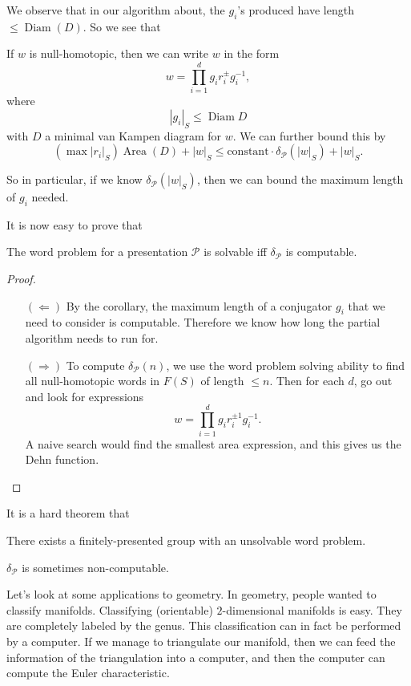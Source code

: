\documentclass[a4paper]{article}
\DeclareMathOperator\Area{Area}
\DeclareMathOperator\Diam{Diam}
\begin{document}
We observe that in our algorithm about, the $g_i$'s produced have length $\leq \Diam(D)$. So we see that
\begin{cor}
  If $w$ is null-homotopic, then we can write $w$ in the form
  \[
    w = \prod_{i = 1}^d g_i r_i^{\pm} g_i^{-1},
  \]
  where
  \[
    |g_i|_S \leq \Diam D
  \]
  with $D$ a minimal van Kampen diagram for $w$. We can further bound this by
  \[
    (\max |r_i|_S) \Area(D) + |w|_S \leq \text{constant} \cdot \delta_{\mathcal{P}}(|w|_S) + |w|_S.
  \]
\end{cor}
So in particular, if we know $\delta_{\mathcal{P}}(|w|_S)$, then we can bound the maximum length of $g_i$ needed.

It is now easy to prove that
\begin{prop}
  The word problem for a presentation $\mathcal{P}$ is solvable iff $\delta_{\mathcal{P}}$ is computable.
\end{prop}

\begin{proof}\leavevmode
  \begin{itemize}
    \item[$(\Leftarrow)$] By the corollary, the maximum length of a conjugator $g_i$ that we need to consider is computable. Therefore we know how long the partial algorithm needs to run for.
    \item[$(\Rightarrow)$] To compute $\delta_{\mathcal{P}}(n)$, we use the word problem solving ability to find all null-homotopic words in $F(S)$ of length $\leq n$. Then for each $d$, go out and look for expressions
      \[
        w = \prod_{i = 1}^d g_i r_i^{\pm 1} g_i^{-1}.
      \]
      A naive search would find the smallest area expression, and this gives us the Dehn function.
  \end{itemize}
\end{proof}

It is a hard theorem that
\begin{thm}
  There exists a finitely-presented group with an unsolvable word problem.
\end{thm}

\begin{cor}
  $\delta_{\mathcal{P}}$ is sometimes non-computable.
\end{cor}

Let's look at some applications to geometry. In geometry, people wanted to classify manifolds. Classifying (orientable) $2$-dimensional manifolds is easy. They are completely labeled by the genus. This classification can in fact be performed by a computer. If we manage to triangulate our manifold, then we can feed the information of the triangulation into a computer, and then the computer can compute the Euler characteristic.
\end{document}
